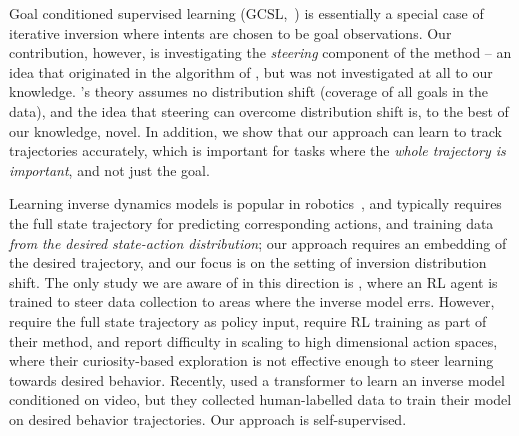 \documentclass[nohyperref]{article}
\begin{document}
Goal conditioned supervised learning (GCSL,~\citealt{ghosh2019learning}) is essentially a special case of iterative inversion where intents are chosen to be goal observations. Our contribution, however, is investigating the \textit{steering} component of the method -- an idea that originated in the algorithm of \citet{ghosh2019learning}, but was not investigated at all to our knowledge. \citet{ghosh2019learning}'s theory assumes no distribution shift (coverage of all goals in the data), and the idea that steering can overcome distribution shift is, to the best of our knowledge, novel. In addition, we show that our approach can learn to track trajectories accurately, which is important for tasks where the \textit{whole trajectory is important}, and not just the goal. 



Learning inverse dynamics models is popular in robotics~\citep{nguyen2010using,calandra2015learning,meier2016towards,christiano2016transfer}, and typically requires the full state trajectory for predicting corresponding actions, and training data \textit{from the desired state-action distribution}; our approach requires an embedding of the desired trajectory, and our focus is on the setting of inversion distribution shift.
The only study we are aware of in this direction is \citet{hong2020adversarial}, where an RL agent is trained to steer data collection to areas where the inverse model errs. However, \citet{hong2020adversarial} require the full state trajectory as policy input, require RL training as part of their method, and report difficulty in scaling to high dimensional action spaces, where their curiosity-based exploration is not effective enough to steer learning towards desired behavior. 
Recently, \citet{baker2022video} used a transformer to learn an inverse model conditioned on video, but they collected human-labelled data to train their model on desired behavior trajectories. Our approach is self-supervised.
\end{document}

